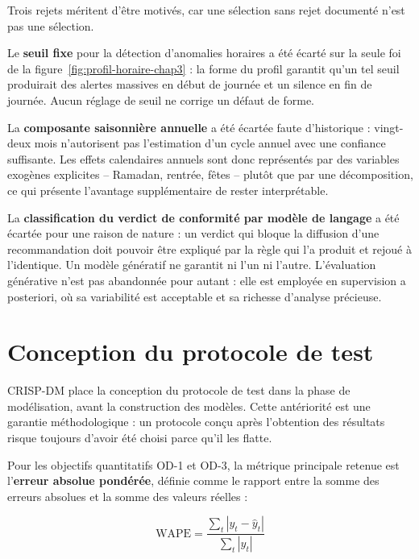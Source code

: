 Trois rejets méritent d'être motivés, car une sélection sans rejet documenté n'est pas une sélection.

Le \textbf{seuil fixe} pour la détection d'anomalies horaires a été écarté sur la seule foi de la figure~\ref{fig:profil-horaire-chap3} : la forme du profil garantit qu'un tel seuil produirait des alertes massives en début de journée et un silence en fin de journée. Aucun réglage de seuil ne corrige un défaut de forme.

La \textbf{composante saisonnière annuelle} a été écartée faute d'historique : vingt-deux mois n'autorisent pas l'estimation d'un cycle annuel avec une confiance suffisante. Les effets calendaires annuels sont donc représentés par des variables exogènes explicites -- Ramadan, rentrée, fêtes -- plutôt que par une décomposition, ce qui présente l'avantage supplémentaire de rester interprétable.

La \textbf{classification du verdict de conformité par modèle de langage} a été écartée pour une raison de nature : un verdict qui bloque la diffusion d'une recommandation doit pouvoir être expliqué par la règle qui l'a produit et rejoué à l'identique. Un modèle génératif ne garantit ni l'un ni l'autre. L'évaluation générative n'est pas abandonnée pour autant : elle est employée en supervision a posteriori, où sa variabilité est acceptable et sa richesse d'analyse précieuse.

\section{Conception du protocole de test}
\label{sec:protocole-test}

CRISP-DM place la conception du protocole de test dans la phase de modélisation, avant la construction des modèles. Cette antériorité est une garantie méthodologique : un protocole conçu après l'obtention des résultats risque toujours d'avoir été choisi parce qu'il les flatte.

Pour les objectifs quantitatifs OD-1 et OD-3, la métrique principale retenue est l'\textbf{erreur absolue pondérée}, définie comme le rapport entre la somme des erreurs absolues et la somme des valeurs réelles :

\begin{equation}
\mathrm{WAPE} = \frac{\sum_{t} \left| y_t - \hat{y}_t \right|}{\sum_{t} \left| y_t \right|}
\end{equation}

